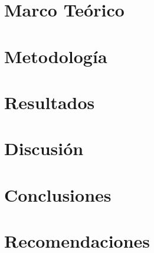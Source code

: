 \documentclass[10pt, letterpaper]{report}
\newcommand{\defaultparformat}[1]{
	{\setlength{\parskip}{2ex}
    }
}
\begin{document}
\ifdefined\CAPmarcoteorico
	\newpage
	\chapter{Marco Teórico}
	\ifdefined\parpordefecto
		\defaultparformat{marco_teorico}
	\else
		
	\fi
\fi


\ifdefined\CAPmetodologia
	\newpage
	\chapter{Metodología}
	\ifdefined\parpordefecto
		\defaultparformat{metodologia}
	\else
		
	\fi
\fi


\ifdefined\CAPresultados
	\newpage
	\chapter{Resultados}
	\ifdefined\parpordefecto
		\defaultparformat{resultados}
	\else
		
	\fi
\fi

\ifdefined\CAPdiscusion
	\newpage
	\chapter{Discusión}
	\ifdefined\parpordefecto
		\defaultparformat{discusion}
	\else
		
	\fi
\fi


\ifdefined\CAPconclusiones
	\newpage
	\chapter{Conclusiones}
	\ifdefined\parpordefecto
		\defaultparformat{conclusiones}
	\else
		
	\fi
\fi

\ifdefined\CAPrecomendaciones
	\newpage
	\chapter{Recomendaciones}
	\ifdefined\parpordefecto
		\defaultparformat{recomendaciones}
	\else
		
	\fi
\fi
\end{document}
